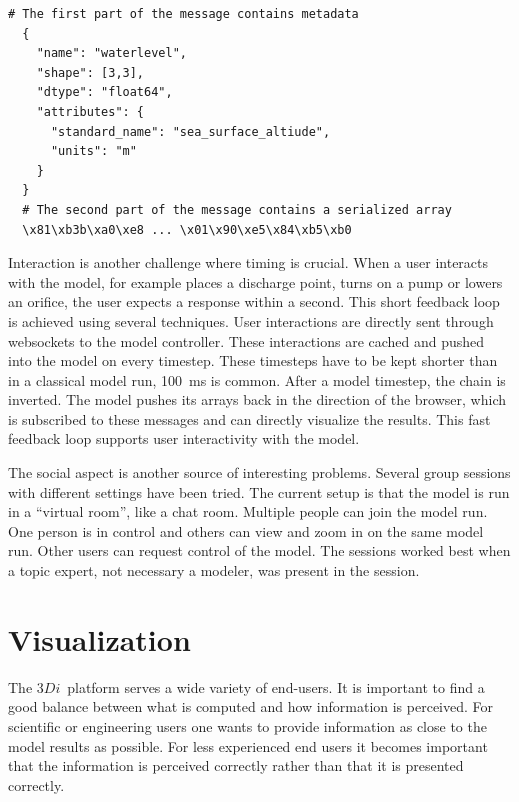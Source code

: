 \documentclass[a4paper]{article}
\DeclareRobustCommand{\threedi}{$3Di$~}
\begin{document}
\begin{lstlisting}[caption=MMI message,label=lst:mmi]
  # The first part of the message contains metadata
  {
    "name": "waterlevel",
    "shape": [3,3],
    "dtype": "float64",
    "attributes": {
      "standard_name": "sea_surface_altiude",
      "units": "m"
    }
  }
  # The second part of the message contains a serialized array
  \x81\xb3b\xa0\xe8 ... \x01\x90\xe5\x84\xb5\xb0
\end{lstlisting}

Interaction is another challenge where timing is crucial. When a user interacts with the model, for example places a discharge point, turns on a pump or lowers an orifice, the user expects a response within a second. This short feedback loop is achieved using several techniques. User interactions are directly sent through websockets \citep{Hickson2012} to the model controller. These interactions are cached and pushed into the model on every timestep. These timesteps have to be kept shorter than in a classical model run, \SI{100}{\milli\second} is common. After a model timestep, the chain is inverted. The model pushes its arrays back in the direction of the browser, which is subscribed to these messages and can directly visualize the results. This fast feedback loop supports user interactivity with the model.

The social aspect is another source of interesting problems. Several group sessions with different settings have been tried. The current setup is that the model is run in a ``virtual room'', like a chat room. Multiple people can join the model run. One person is in control and others can view and zoom in on the same model run. Other users can request control of the model. The sessions worked best when a topic expert, not necessary a modeler, was present in the session.

\section{Visualization}
The \threedi platform serves a wide variety of end-users. It is important to find a good balance between what is computed and how information is perceived. For scientific or engineering users one wants to provide information as close to the model results as possible. For less experienced end users it becomes important that the information is perceived correctly rather than that it is presented correctly.
\end{document}
